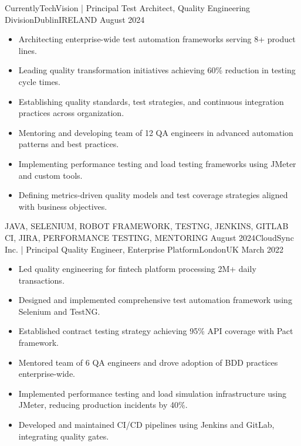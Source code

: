 \vspace{1em}
\begin{experiences}
  \experience
    {Currently}{TechVision | Principal Test Architect, Quality Engineering Division}{Dublin}{IRELAND} {August 2024} {
           \begin{itemize}
               \item Architecting enterprise-wide test automation frameworks serving 8+ product lines.
               \item Leading quality transformation initiatives achieving 60\% reduction in testing cycle times.
               \item Establishing quality standards, test strategies, and continuous integration practices across organization.
               \item Mentoring and developing team of 12 QA engineers in advanced automation patterns and best practices.
               \item Implementing performance testing and load testing frameworks using JMeter and custom tools.
               \item Defining metrics-driven quality models and test coverage strategies aligned with business objectives.
           \end{itemize}
        }
        {JAVA, SELENIUM, ROBOT FRAMEWORK, TESTNG, JENKINS, GITLAB CI, JIRA, PERFORMANCE TESTING, MENTORING}
  \emptySeparator
  \experience
    {August 2024}{CloudSync Inc. | Principal Quality Engineer, Enterprise Platform}{London}{UK} {March 2022} {
           \begin{itemize}
               \item Led quality engineering for fintech platform processing 2M+ daily transactions.
               \item Designed and implemented comprehensive test automation framework using Selenium and TestNG.
               \item Established contract testing strategy achieving 95\% API coverage with Pact framework.
               \item Mentored team of 6 QA engineers and drove adoption of BDD practices enterprise-wide.
               \item Implemented performance testing and load simulation infrastructure using JMeter, reducing production incidents by 40\%.
               \item Developed and maintained CI/CD pipelines using Jenkins and GitLab, integrating quality gates.

\end{itemize}}
\end{experiences}
